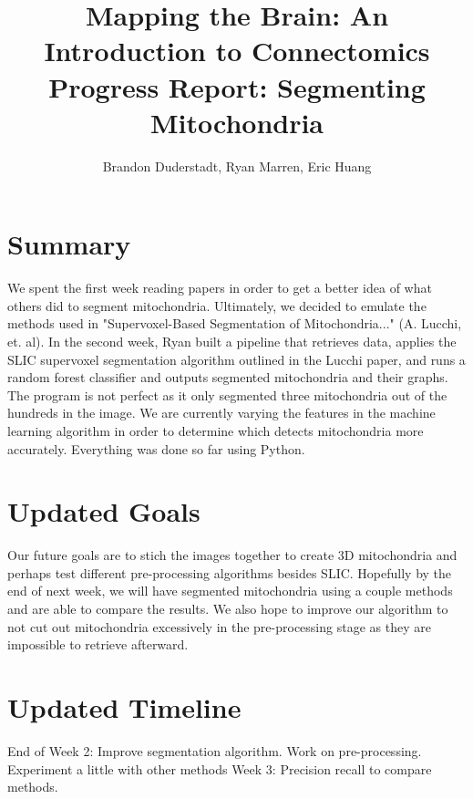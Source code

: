 \documentclass[11pt]{article} %
\title{Mapping the Brain: An Introduction to Connectomics\\Progress Report: Segmenting Mitochondria}
\author{Brandon Duderstadt, Ryan Marren, Eric Huang}
\begin{document}
\maketitle

\section{Summary}

We spent the first week reading papers in order to get a better idea of what others did to segment mitochondria. Ultimately, we decided to emulate the methods used in "Supervoxel-Based Segmentation of Mitochondria..." (A. Lucchi, et. al). In the second week, Ryan built a pipeline that retrieves data, applies the SLIC supervoxel segmentation algorithm outlined in the Lucchi paper, and runs a random forest classifier and outputs segmented mitochondria and their graphs. The program is not perfect as it only segmented three mitochondria out of the hundreds in the image. We are currently varying the features in the machine learning algorithm in order to determine which detects mitochondria more accurately. Everything was done so far using Python.

\section{Updated Goals}
Our future goals are to stich the images together to create 3D mitochondria and perhaps test different pre-processing algorithms besides SLIC. Hopefully by the end of next week, we will have segmented mitochondria using a couple methods and are able to compare the results. We also hope to improve our algorithm to not cut out mitochondria excessively in the pre-processing stage as they are impossible to retrieve afterward.

\section{Updated Timeline}
End of Week 2: Improve segmentation algorithm. Work on pre-processing. Experiment a little with other methods
Week 3: Precision recall to compare methods.

{}

\end{document}
